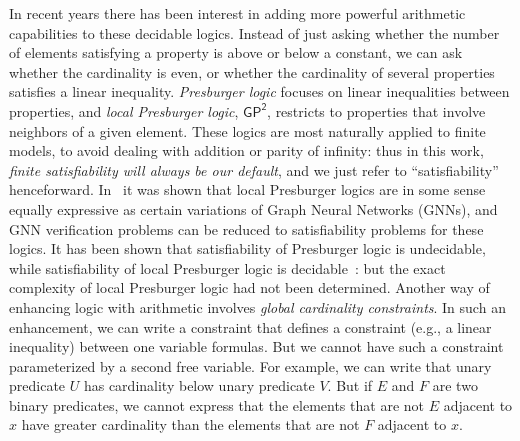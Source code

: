 \documentclass[10pt,a4paper]{article}
\theoremstyle{definition}
\theoremstyle{remark}
\newcommand{\GPtwo}   {\mathsf{GP^2}}
\begin{document}
In recent years there has been interest in adding more powerful arithmetic capabilities to these decidable logics. Instead of just asking whether the number of elements satisfying a property is above or below a constant, 
we can ask whether the cardinality is even, or whether 
the cardinality of several properties satisfies a linear inequality. 
\emph{Presburger logic} focuses on linear inequalities between properties, 
and \emph{local Presburger logic}, $\GPtwo$, restricts to properties that involve neighbors of a given element. 
These logics are most naturally applied to finite models, to avoid dealing with addition or parity of infinity: 
thus in this work, \emph{finite satisfiability will always be our default}, and 
we just refer to ``satisfiability'' henceforward. 
In~\cite{usicalp} it was shown that local Presburger logics are in some sense equally expressive as 
certain variations of Graph Neural Networks (GNNs), and 
GNN verification problems can be reduced to satisfiability problems for these logics.
It has been shown that satisfiability of Presburger logic is undecidable, while satisfiability of local Presburger logic is decidable~\cite{percentage}: but the exact complexity of local Presburger logic had not been determined. Another way of enhancing logic with arithmetic involves \emph{global cardinality constraints}. 
In such an enhancement, we can write a constraint that defines a constraint (e.g., a linear inequality) 
between one variable formulas. But we cannot have such a constraint parameterized by a second free variable.  For example, we can write that unary predicate $U$ has cardinality below unary predicate $V$. But if $E$ and $F$ are two binary predicates, we cannot express that the elements that are not $E$ adjacent to $x$ have greater cardinality than the elements that are not $F$ adjacent to $x$.
\end{document}
